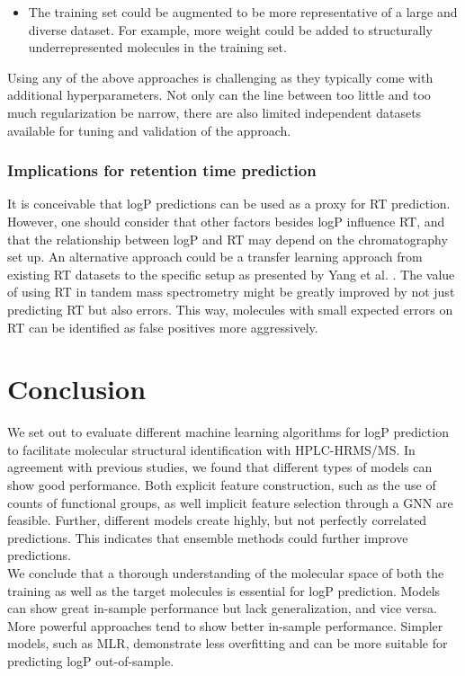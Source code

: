 \documentclass{article}
\begin{document}
\begin{itemize}
\item The training set could be augmented to be more representative of a large and diverse dataset. For example, more weight could be added to structurally underrepresented molecules in the training set.
\end{itemize}

Using any of the above approaches is challenging as they typically come with additional hyperparameters. Not only can the line between too little and too much regularization be narrow, there are also limited independent datasets available for tuning and validation of the approach. \\

\subsubsection{Implications for retention time prediction}

It is conceivable that logP predictions can be used as a proxy for RT prediction. However, one should consider that other factors besides logP influence RT, and that the relationship between logP and RT may depend on the chromatography set up. An alternative approach could be a transfer learning approach from existing RT datasets to the specific setup as presented by Yang et al. \cite{yang2021prediction}. The value of using RT in tandem mass spectrometry might be greatly improved by not just predicting RT but also errors. This way, molecules with small expected errors on RT can be identified as false positives more aggressively.

\section{Conclusion}

We set out to evaluate different machine learning algorithms for logP prediction to facilitate molecular structural identification with HPLC-HRMS/MS. In agreement with previous studies, we found that different types of models can show good performance. Both explicit feature construction, such as the use of counts of functional groups, as well implicit feature selection through a GNN are feasible. Further, different models create highly, but not perfectly correlated predictions. This indicates that ensemble methods could further improve predictions.\\

We conclude that a thorough understanding of the molecular space of both the training as well as the target molecules is essential for logP prediction. Models can show great in-sample performance but lack generalization, and vice versa. More powerful approaches tend to show better in-sample performance. Simpler models, such as MLR, demonstrate less overfitting and can be more suitable for predicting logP out-of-sample. \\
\end{document}
